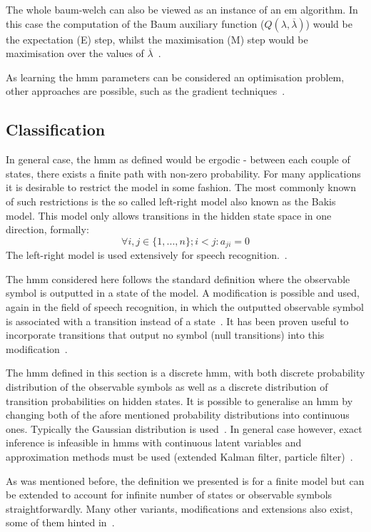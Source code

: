 The whole \gls{baum-welch} can also be viewed as an instance of an \gls{em} algorithm. In this case the computation of the Baum auxiliary function ($Q(\lambda,\overline{\lambda})$) would be the expectation (E) step, whilst the maximisation (M) step would be maximisation over the values of $\overline{\lambda}$~\cite{Dempster1977, Rabiner89hmm}.

As learning the \gls{hmm} parameters can be considered an optimisation problem, other approaches are possible, such as the gradient techniques~\cite{levinson1983, Rabiner89hmm}.

\subsection{Classification}

In general case, the \gls{hmm} as defined would be ergodic - between each couple of states, there exists a finite path with non-zero probability. For many applications it is desirable to restrict the model in some fashion. The most commonly known of such restrictions is the so called left-right model also known as the Bakis model. This model only allows transitions in the hidden state space in one direction, formally: $$\forall i,j \in \{1, ..., n\}; i < j: a_{ji} = 0$$
The left-right model is used extensively for speech recognition.~\cite{bakis1976, jelinek1976}.

The \gls{hmm} considered here follows the standard definition where the observable symbol is outputted in a state of the model. A modification is possible and used, again in the field of speech recognition, in which the outputted observable symbol is associated with a transition instead of a state~\cite{Rabiner89hmm, jelinek1983}. It has been proven useful to incorporate transitions that output no symbol (null transitions) into this modification~\cite{jelinek1983}.

The \gls{hmm} defined in this section is a discrete \acrlong{hmm}, with both discrete probability distribution of the observable symbols as well as a discrete distribution of transition probabilities on hidden states. It is possible to generalise an \gls{hmm} by changing both of the afore mentioned probability distributions into continuous ones. Typically the Gaussian distribution is used~\cite{cappe2005, piyathilaka2013}. In general case however, exact inference is infeasible in \glspl{hmm} with continuous latent variables and approximation methods must be used (extended Kalman filter, particle filter)~\cite{cappe2005}.

As was mentioned before, the definition we presented is for a finite model but can be extended to account for infinite number of states or observable symbols straightforwardly. Many other variants, modifications and extensions also exist, some of them hinted in~\cite{Rabiner89hmm}.

